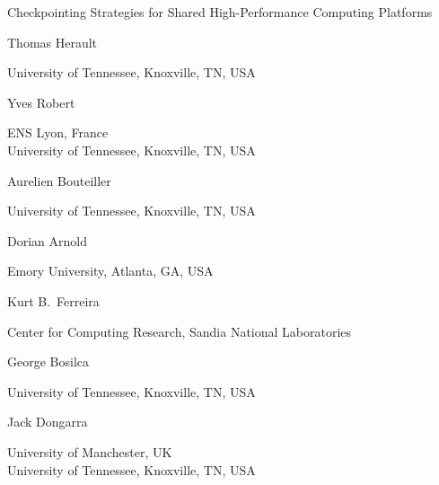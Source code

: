 \documentclass[two]{article}
\newcommand{\jtitle}{Checkpointing Strategies for Shared High-Performance Computing Platforms}
\begin{document}
\thispagestyle{empty}
\copyrightheader


\begin{center}
\jtitle

\vspace{20pt}

Thomas Herault

\vspace{2pt}
University of Tennessee, Knoxville, TN, USA


\vspace{10pt}
Yves Robert\

\vspace{2pt}
ENS Lyon,  France\\
University of Tennessee, Knoxville, TN, USA


\vspace{10pt}

Aurelien Bouteiller

\vspace{2pt}
University of Tennessee, Knoxville, TN, USA


\vspace{10pt}
Dorian Arnold

\vspace{2pt}
Emory University, Atlanta, GA, USA

\vspace{10pt}
Kurt B.~Ferreira

\vspace{2pt}
Center for Computing Research, Sandia National
Laboratories

\vspace{10pt}
George Bosilca

\vspace{2pt}
University of Tennessee, Knoxville, TN, USA

%
\vspace{10pt}
Jack Dongarra

\vspace{2pt}
University of Manchester, UK\\
University of Tennessee, Knoxville, TN, USA

\vspace{20pt}

\end{center}
\end{document}
